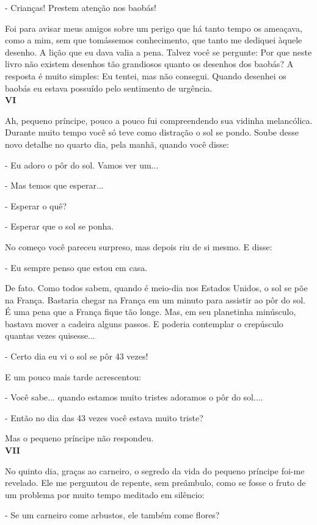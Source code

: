 \begin{Parallel}[p]{}{}
{- Crianças! Prestem atenção nos baobás!

Foi para avisar meus amigos sobre um perigo que há tanto tempo os
ameaçava, como a mim, sem que tomássemos conhecimento, que tanto me
dediquei àquele desenho. A lição que eu dava valia a pena. Talvez você
se pergunte: Por que neste livro não existem desenhos tão grandiosos
quanto os desenhos dos baobás? A resposta é muito simples: Eu tentei,
mas não consegui. Quando desenhei os baobás eu estava possuído pelo
sentimento de urgência.\\

\textbf{VI}

Ah, pequeno príncipe, pouco a pouco fui compreendendo sua vidinha
melancólica. Durante muito tempo você só teve como distração o sol se
pondo. Soube desse novo detalhe no quarto dia, pela manhã, quando você
disse:

- Eu adoro o pôr do sol. Vamos ver um...

- Mas temos que esperar...

- Esperar o quê?

- Esperar que o sol se ponha.

No começo você pareceu surpreso, mas depois riu de si mesmo. E disse:

- Eu sempre penso que estou em casa.

De fato. Como todos sabem, quando é meio-dia nos Estados Unidos, o sol
se põe na França. Bastaria chegar na França em um minuto para assistir
ao pôr do sol. É uma pena que a França fique tão longe. Mas, em seu
planetinha minúsculo, bastava mover a cadeira alguns passos. E poderia
contemplar o crepúsculo quantas vezes quisesse...

- Certo dia eu vi o sol se pôr 43 vezes!

E um pouco mais tarde acrescentou:

- Você sabe... quando estamos muito tristes adoramos o pôr do sol....

- Então no dia das 43 vezes você estava muito triste?

Mas o pequeno príncipe não respondeu.\\

\textbf{VII}

No quinto dia, graças ao carneiro, o segredo da vida do pequeno príncipe
foi-me revelado. Ele me perguntou de repente, sem preâmbulo, como se
fosse o fruto de um problema por muito tempo meditado em silêncio:

- Se um carneiro come arbustos, ele também come flores?

}
\end{Parallel}
